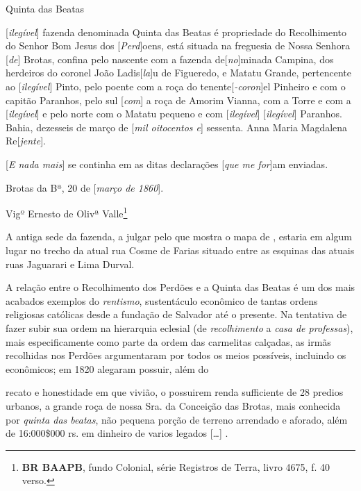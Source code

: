\begin{citacao}
Quinta das Beatas

[\textit{ilegível}] fazenda denominada Quinta das Beatas é propriedade do Recolhimento do Senhor Bom Jesus dos [\textit{Perd}]oens, está situada na freguesia de Nossa Senhora [\textit{de}] Brotas, confina pelo nascente com a fazenda de[\textit{no}]minada Campina, dos herdeiros do coronel João Ladis[\textit{la}]u de Figueredo, e Matatu Grande, pertencente ao [\textit{ilegível}] Pinto, pelo poente com a roça do tenente[\textit{-coron}]el Pinheiro e com o capitão Paranhos, pelo sul [\textit{com}] a roça de Amorim Vianna, com a Torre e com a [\textit{ilegível}] e pelo norte com o Matatu pequeno e com [\textit{ilegível}] [\textit{ilegível}] Paranhos. Bahia, dezesseis de março de [\textit{mil oitocentos e}] sessenta. Anna Maria Magdalena Re[\textit{jente}]. 

[\textit{E nada mais}] se continha em as ditas declarações [\textit{que me for}]am enviadas.

Brotas da Bª, 20 de [\textit{março de 1860}].

Vigº Ernesto de Olivª Valle\footnote{\textbf{BR BAAPB}, fundo Colonial, série Registros de Terra, livro 4675, f. 40 verso.}
\end{citacao}

A antiga sede da fazenda, a julgar pelo que mostra o mapa de , estaria em algum lugar no trecho da atual rua Cosme de Farias situado entre as esquinas das atuais ruas Jaguarari e Lima Durval.

A relação entre o Recolhimento dos Perdões e a Quinta das Beatas é um dos mais acabados exemplos do \textit{rentismo}, sustentáculo econômico de tantas ordens religiosas católicas desde a fundação de Salvador até o presente. Na tentativa de fazer subir sua ordem na hierarquia eclesial (de \textit{recolhimento} a \textit{casa de professas}), mais especificamente como parte da ordem das carmelitas calçadas, as irmãs recolhidas nos Perdões argumentaram por todos os meios possíveis, incluindo os econômicos; em 1820 alegaram possuir, além do 

\begin{citacao}
recato e honestidade em que vivião, o possuirem renda sufficiente de 28 predios urbanos, a grande roça de nossa Sra. da Conceição das Brotas, mais conhecida por \textit{quinta das beatas}, não pequena porção de terreno arrendado e aforado, além de 16:000\$000 rs. em dinheiro de varios legados [\dots] \cite[p.~231]{accioli_memorias5_1937}.
\end{citacao}

